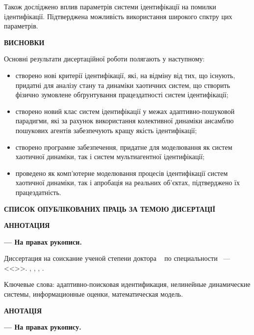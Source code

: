\documentclass[a4paper,13pt]{atuaref}
\newcommand{\xsect}[1]{\medskip\begin{center}\textbf{#1}\end{center}\medskip\penalty10000}
\begin{document}
Також досліджено вплив параметрів системи ідентифікації на помилки ідентифікації.
Підтверджена можливість використання широкого спктру цих параметрів.



\xsect{ВИСНОВКИ}

Основні результати дисертаційної роботи полягають у наступному:

\begin{itemize}

  \item
  створено нові критерії ідентифікації, які, на відміну від тих, що
  існують, придатні для аналізу стану та динаміки
  хаотичних систем, що створить фізично зумовлене обґрунтування працездатності систем
  ідентифікації;

  \item
  створено новий клас систем ідентифікації у межах
    адаптивно-пошуковой парадигми,
    які за рахунок використання колективної динаміки
    ансамблю пошукових агентів забезпечують
    кращу якість ідентифікації;

  \item
  створено програмне забезпечення, придатне для моделювання як систем
  хаотичної динаміки, так і систем мультиагентної ідентифікації;

  \item
  проведено як комп'ютерне моделювання процесів ідентифікації систем
    хаотичної динаміки, так і апробація на реальних об'єктах, підтверджено їх працездатність.


\end{itemize}


\xsect{СПИСОК ОПУБЛІКОВАНИХ ПРАЦЬ ЗА ТЕМОЮ ДИСЕРТАЦІЇ}

\nocite{*}

\printbibliography[heading=none]




\xsect{АННОТАЦИЯ}

\textbf{\dissauthorRu}
\textbf{\booknameRu}
\textbf{--- На правах рукописи.}

Диссертация на соискание ученой степени
доктора
\dissScopeRu\ {}
по специальности
\dissSpecId\ --- <<\dissSpecRu>>.
\institutionRu, \belongRu, \cityRu, \bookyear.


Ключевые слова:
адаптивно-поисковая идентификация, нелинейные динамические системы,
информационные оценки, математическая модель.


\xsect{АНОТАЦІЯ}

\textbf{\dissauthorUa}
\textbf{\booknameUa}
\textbf{--- На правах рукопису.}
\end{document}
